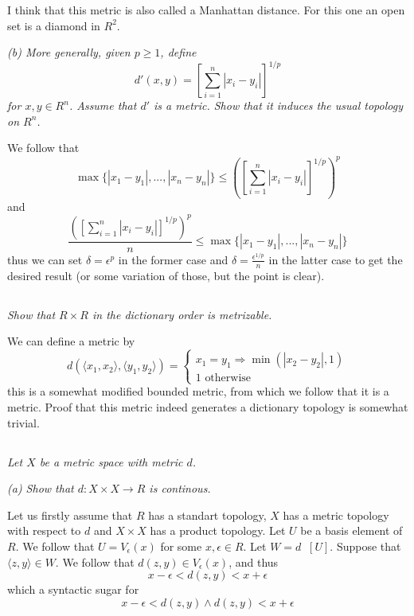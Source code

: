 \documentclass[11pt,oneside,titlepage]{book}
\DeclareMathOperator \inv {^{-1}}
\DeclareMathOperator \ra {\Rightarrow}
\newcommand{\eangle}[1]{\langle #1 \rangle}
\newcommand{\set}[1]{\{ #1 \}}
\begin{document}
I think that this metric is also called a Manhattan distance. For this one an open set
is a diamond in $R^2$.

\textit{(b) More generally, given $p \geq 1$, define
  $$d'(x, y) = \left[\sum_{i = 1}^{n}{|x_i - y_i|}\right]^{1/p}$$
  for $x, y \in R^n$. Assume that $d'$ is a metric. Show that it induces the usual
  topology on $R^n$.
}

We follow that
$$\max\set{|x_1 - y_1|, ..., |x_n - y_n|} \leq
\left(\left[\sum_{i = 1}^{n}{|x_i - y_i|}\right]^{1/p}\right)^p$$
and
$$\frac{\left(\left[\sum_{i = 1}^{n}{|x_i - y_i|}\right]^{1/p}\right)^p}{n} \leq
\max\set{|x_1 - y_1|, ..., |x_n - y_n|}$$
thus we can set $\delta = \epsilon^p$ in the former case and $\delta = \frac{\epsilon^{1/p}}{n}$
in the latter case to get the desired result (or some variation of those, but the point is clear).

\subsection{}

\textit{Show that $R \times R$ in the dictionary order is metrizable.}

We can define a metric by
$$d(\eangle{x_1, x_2}, \eangle{y_1, y_2}) =
\begin{cases}
  x_1 = y_1 \ra \min(|x_2 - y_2|, 1) \\
  1 \text{ otherwise}
\end{cases}
$$
this is a somewhat modified bounded metric, from which we follow that it is a metric.
Proof that this metric indeed generates a dictionary topology is somewhat trivial.

\subsection{}

\textit{Let $X$ be a metric space with metric $d$.}

\textit{(a) Show that $d: X \times X \to R$ is continous.}

Let us firstly assume that $R$ has a standart topology, $X$ has a metric topology
with respect to $d$ and $X \times X$ has a product topology.
Let $U$ be a basis element of $R$.
We follow that $U = V_\epsilon(x)$ for some $x, \epsilon \in R$.
Let $W = d\inv[U]$. Suppose that $\eangle{z, y} \in W$. We follow that
$d(z, y) \in V_\epsilon(x)$, and thus
$$x - \epsilon < d(z, y) < x + \epsilon$$
which a syntactic sugar for
$$x - \epsilon < d(z, y) \land d(z, y)  < x + \epsilon$$
\end{document}
